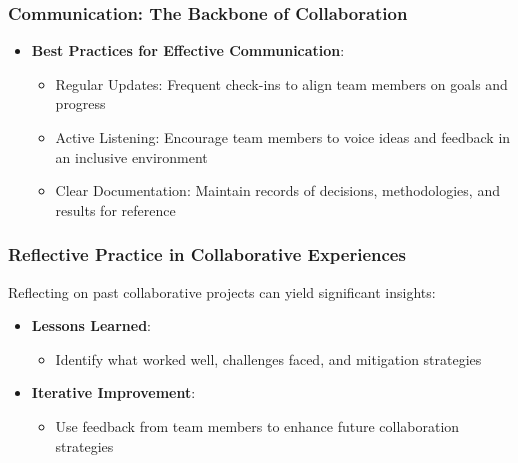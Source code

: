 \documentclass{beamer}
\begin{document}
\begin{frame}[fragile]
    \frametitle{Communication: The Backbone of Collaboration}
    \begin{itemize}
        \item \textbf{Best Practices for Effective Communication}:
        \begin{itemize}
            \item Regular Updates: Frequent check-ins to align team members on goals and progress
            \item Active Listening: Encourage team members to voice ideas and feedback in an inclusive environment
            \item Clear Documentation: Maintain records of decisions, methodologies, and results for reference
        \end{itemize}
    \end{itemize}
\end{frame}

\begin{frame}[fragile]
    \frametitle{Reflective Practice in Collaborative Experiences}
    Reflecting on past collaborative projects can yield significant insights:
    \begin{itemize}
        \item \textbf{Lessons Learned}:
        \begin{itemize}
            \item Identify what worked well, challenges faced, and mitigation strategies
        \end{itemize}
        
        \item \textbf{Iterative Improvement}:
        \begin{itemize}
            \item Use feedback from team members to enhance future collaboration strategies
        \end{itemize}
    \end{itemize}
\end{frame}
\end{document}
